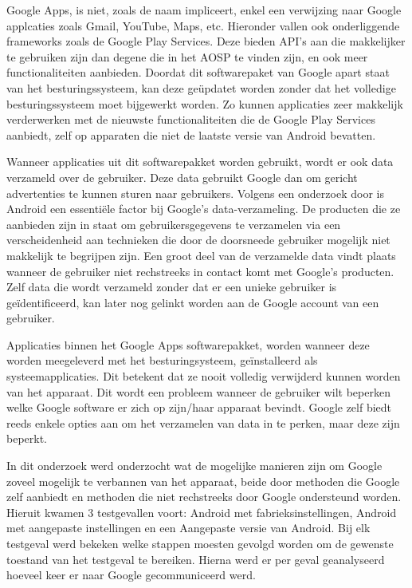 Google Apps, is niet, zoals de naam impliceert, enkel een verwijzing naar Google applcaties zoals Gmail, YouTube, Maps, etc. Hieronder vallen ook onderliggende frameworks zoals de Google Play Services. Deze bieden API's aan die makkelijker te gebruiken zijn dan degene die in het AOSP te vinden zijn, en ook meer functionaliteiten aanbieden. Doordat dit softwarepaket van Google apart staat van het besturingssysteem, kan deze geüpdatet worden zonder dat het volledige besturingssysteem moet bijgewerkt worden. Zo kunnen applicaties zeer makkelijk verderwerken met de nieuwste functionaliteiten die de Google Play Services aanbiedt, zelf op apparaten die niet de laatste versie van Android bevatten.

Wanneer applicaties uit dit softwarepakket worden gebruikt, wordt er ook data verzameld over de gebruiker. Deze data gebruikt Google dan om gericht advertenties te kunnen sturen naar gebruikers. Volgens een onderzoek door \cite{schmidt_google-data-collection} is Android een essentiële factor bij Google's data-verzameling. De producten die ze aanbieden zijn in staat om gebruikersgegevens te verzamelen via een verscheidenheid aan technieken die door de doorsneede gebruiker mogelijk niet makkelijk te begrijpen zijn. Een groot deel van de verzamelde data vindt plaats wanneer de gebruiker niet rechstreeks in contact komt met Google's producten. Zelf data die wordt verzameld zonder dat er een unieke gebruiker is geïdentificeerd, kan later nog gelinkt worden aan de Google account van een gebruiker.

Applicaties binnen het Google Apps softwarepakket, worden wanneer deze worden meegeleverd met het besturingsysteem, geïnstalleerd als systeemapplicaties. Dit betekent dat ze nooit volledig verwijderd kunnen worden van het apparaat. Dit wordt een probleem wanneer de gebruiker wilt beperken welke Google software er zich op zijn/haar apparaat bevindt. Google zelf biedt reeds enkele opties aan om het verzamelen van data in te perken, maar deze zijn beperkt.

In dit onderzoek werd onderzocht wat de mogelijke manieren zijn om Google zoveel mogelijk te verbannen van het apparaat, beide door methoden die Google zelf aanbiedt en methoden die niet rechstreeks door Google ondersteund worden. Hieruit kwamen 3 testgevallen voort: Android met fabrieksinstellingen, Android met aangepaste instellingen en een Aangepaste versie van Android. Bij elk testgeval werd bekeken welke stappen moesten gevolgd worden om de gewenste toestand van het testgeval te bereiken. Hierna werd er per geval geanalyseerd hoeveel keer er naar Google gecommuniceerd werd.
